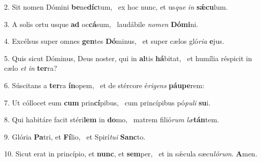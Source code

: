 2. Sit nomen Dómini \textbf{be}ne\textbf{díc}tum, \ast\  ex hoc nunc, et us\textit{que} \textit{in} \textbf{sǽ}\textbf{cu}lum.\

3. A solis ortu usque \textbf{ad} oc\textbf{cá}sum, \ast\  laudábile \textit{no}\textit{men} \textbf{Dó}\textbf{mi}ni.\

4. Excélsus super omnes \textbf{gen}tes \textbf{Dó}minus, \ast\  et super cælos gló\textit{ri}\textit{a} \textbf{e}jus.\

5. Quis sicut Dóminus, Deus noster, qui in \textbf{al}tis \textbf{há}bitat, \ast\  et humília réspicit in cælo \textit{et} \textit{in} \textbf{ter}ra?\

6. Súscitans a \textbf{ter}ra \textbf{ín}opem, \ast\  et de stércore é\textit{ri}\textit{gens} \textbf{páu}\textbf{pe}rem:\

7. Ut cóllocet eum \textbf{cum} prin\textbf{cí}pibus, \ast\  cum princípibus pó\textit{pu}\textit{li} \textbf{su}i.\

8. Qui habitáre facit stéri\textbf{lem} in \textbf{do}mo, \ast\  matrem filió\textit{rum} \textit{læ}\textbf{tán}tem.\

9. Glória \textbf{Pa}tri, et \textbf{Fí}lio, \ast\  et Spirí\textit{tu}\textit{i} \textbf{Sanc}to.\

10. Sicut erat in princípio, et \textbf{nunc}, et \textbf{sem}per, \ast\  et in sǽcula sæcu\textit{ló}\textit{rum}. \textbf{A}men.\

